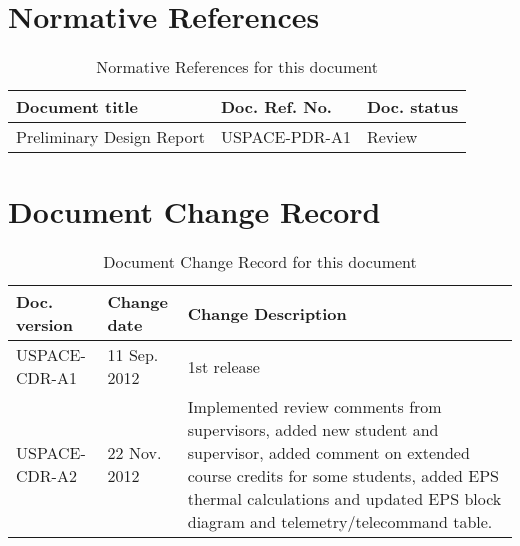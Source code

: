 \thispagestyle{plain}
\chapter*{Normative References}
%
\begin{table}[H]
\centering
\caption{Normative References for this document}
\label{tab:normative_references}
\begin{tabular}{lll}
\hline
\textbf{Document title} & \textbf{Doc. Ref. No.} & \textbf{Doc. status}\\
\hline
Preliminary Design Report & USPACE-PDR-A1 & Review\\
\hline
\end{tabular}
\end{table}
%
\newpage
%
\thispagestyle{plain}
\chapter*{Document Change Record}
%
%
\begin{table}[H]
\centering
\caption{Document Change Record for this document}
\label{tab:document_change_record}
\begin{tabular}{p{}p{}p{}}
\hline
\textbf{Doc. version} & \textbf{Change date} & \textbf{Change Description}\\
\hline
USPACE-CDR-A1 & 11 Sep. 2012 & 1st release\\
USPACE-CDR-A2 & 22 Nov. 2012 & Implemented review comments from supervisors, added new student and supervisor, added comment on extended course credits for some students, added EPS thermal calculations and updated EPS block diagram and telemetry/telecommand table.\\
\hline
\end{tabular}
\end{table}